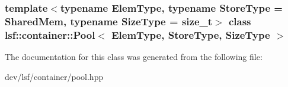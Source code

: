 \subsubsection*{template$<$typename ElemType, typename StoreType = SharedMem, typename SizeType = size\_\-t$>$ class lsf::container::Pool$<$ ElemType, StoreType, SizeType $>$}



The documentation for this class was generated from the following file:\begin{DoxyCompactItemize}
\item 
dev/lsf/container/pool.hpp\end{DoxyCompactItemize}
